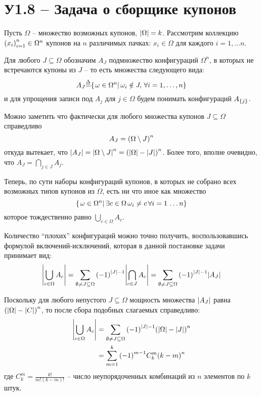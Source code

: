 \documentclass[a4paper]{article}
\title{\rus{Домашняя работа по курсу \\ ``Теоретико-вероятностные методы в статистике''}}
\author{\rus{Назаров Иван,} \rus{101мНОД(ИССА)}}
\let\originalleft\left
\let\originalright\right
\renewcommand{\left}{\mathopen{}\mathclose\bgroup\originalleft}
\renewcommand{\right}{\aftergroup\egroup\originalright}
\newcommand{\obj}[1]{{\left\{ #1 \right \}}}
\newcommand{\brac}[1]{{\left ( #1 \right )}}
\newcommand{\induc}[1]{{\left . #1 \right \vert}}
\newcommand{\abs}[1]{{\left | #1 \right |}}
\newcommand{\defn}{{\mathop{\overset{\Delta}{=}}\nolimits}}
\begin{document}
\maketitle

\section{У1.8 -- Задача о сборщике купонов} %
\label{sec:task_1_8}

Пусть $\Omega$ -- множество возможных купонов, $\abs{\Omega} = k$.
Рассмотрим коллекцию $\brac{x_i}_{i=1}^n\in \Omega^n$ купонов на $n$
различимых пачках: $x_i\in \Omega$ для каждого $i=1,\ldots n$.

Для любого $J\subseteq \Omega$ обозначим $A_J$ подмножество конфигураций
$\Omega^n$, в которых не встречаются купоны из $J$ -- то есть множества
следующего вида:
\[A_J \defn \obj{ \induc{ \omega\in \Omega^n }\, \omega_i \notin J,\, \forall i = 1,\ldots,n }\]
и для упрощения записи под $A_j$ для $j\in \Omega$ будем понимать 
конфигураций $A_{\obj{j}}$.

Можно заметить что фактически для любого множества купонов $J\subseteq \Omega$
справедливо
\[A_J = \brac{\Omega\setminus J}^n\]
откуда вытекает, что $\abs{A_J} = \abs{\Omega\setminus J}^n = \brac{\abs{\Omega} - \abs{J}}^n$.
Более того, вполне очевидно, что $A_J = \bigcap_{j\in J} A_j$.

Теперь, по сути наборы конфигураций купонов, в которых не собрано всех
возможных типов купонов из $\Omega$, есть ни что иное как множество
\[\obj{ \induc{ \omega\in \Omega^n }\,\exists c\in \Omega\, \omega_i \neq c\, \forall i=1\,\ldots n}\]
которое тождественно равно $\bigcup_{c\in \Omega} A_c$.

Количество ``плохих'' конфигураций можно точно получить, воспользовавшись
формулой включений-исключений, которая в данной постановке задачи принимает
вид:
\[\abs{ \bigcup_{c\in \Omega} A_c }
= \sum_{\emptyset \neq J\subseteq \Omega}
\brac{-1}^{\abs{J} - 1} \abs{\bigcap_{c\in J} A_c}
= \sum_{\emptyset \neq J\subseteq \Omega}
\brac{-1}^{\abs{J} - 1} \abs{A_J} \]

Поскольку для любого непустого $J\subseteq \Omega$ мощность множества
$\abs{A_J}$ равна $\brac{\abs{\Omega} - \abs{C}}^n$, то после сбора подобных
слагаемых справедливо:
\begin{align*}
	\abs{ \bigcup_{c\in \Omega} A_c }
	&= \sum_{\emptyset \neq J\subseteq \Omega}
		\brac{-1}^{\abs{J} - 1} \brac{\abs{\Omega} - \abs{J}}^n \\
	&= \sum_{m=1}^k \brac{-1}^{m-1} C^m_k \brac{k - m}^n
\end{align*}
где $C^m_k = \frac{k!}{m!(k-m)!}$ -- число неупорядоченных комбинаций из $n$
элементов по $k$ штук.
\end{document}

